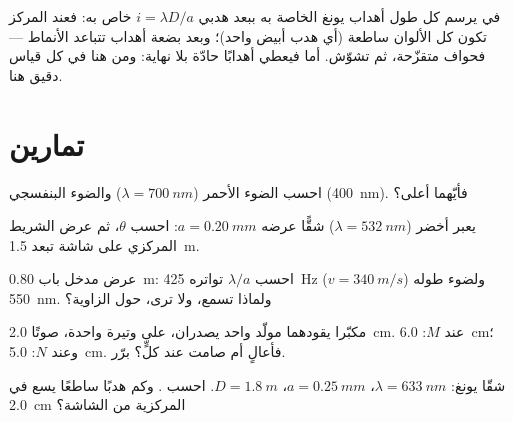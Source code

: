 \begin{remark}\label{rem:g12:light-as-wave:white}
في  يرسم كل طول  أهداب يونغ الخاصة به ببعد هدبي
$i = \lambda D/a$ خاص به: فعند المركز تكون كل الألوان ساطعة (أي هدب أبيض
واحد)؛ وبعد بضعة أهداب تتباعد الأنماط --- فحواف متقزّحة،
ثم تشوّش. أما  فيعطي أهدابًا حادّة بلا
نهاية: ومن هنا  في كل قياس دقيق هنا.
\end{remark}

\section{تمارين}

\begin{exercise}[$\star$]\label{exo:g12:light-as-wave:1}
احسب  الضوء الأحمر ($\lambda = \qty{700}{nm}$) والضوء
البنفسجي (\qty{400}{nm}). فأيّهما أعلى؟
\end{exercise}

\begin{exercise}[$\star$]\label{exo:g12:light-as-wave:2}
يعبر  أخضر ($\lambda = \qty{532}{nm}$) شقًّا عرضه
$a = \qty{0.20}{mm}$: احسب $\theta$، ثم عرض الشريط المركزي
على شاشة تبعد \qty{1.5}{m}.
\end{exercise}

\begin{exercise}[$\star$]\label{exo:g12:light-as-wave:3}
عرض مدخل باب \qty{0.80}{m}: احسب $\lambda/a$  تواتره
\qty{425}{Hz} ($v = \qty{340}{m/s}$) ولضوء طوله
\qty{550}{nm}. ولماذا تسمع، ولا ترى، حول الزاوية؟
\end{exercise}

\begin{exercise}[$\star$]\label{exo:g12:light-as-wave:4}
مكبّرا  يقودهما مولّد واحد يصدران، على وتيرة واحدة، صوتًا  \qty{2.0}{cm}.  عند $M$: \qty{6.0}{cm}؛ وعند
$N$: \qty{5.0}{cm}. فأعالٍ  أم صامت عند كلٍّ؟ برّر.
\end{exercise}

\begin{exercise}[$\star$]\label{exo:g12:light-as-wave:5}
شقّا يونغ: $\lambda = \qty{633}{nm}$، $a = \qty{0.25}{mm}$،
$D = \qty{1.8}{m}$. احسب . وكم هدبًا ساطعًا
يسع في \qty{2.0}{cm} المركزية من الشاشة؟
\end{exercise}


